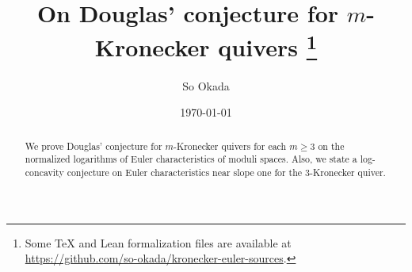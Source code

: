 \documentclass[11pt,a4paper]{article}
\title{On Douglas' conjecture for $m$-Kronecker quivers%
\thanks{Some \TeX{} and Lean formalization files are available at\\
\url{https://github.com/so-okada/kronecker-euler-sources}.}}
\author{So Okada}
\date{\today{}}
\numberwithin{equation}{section}
\theoremstyle{definition}
\theoremstyle{remark}
\begin{document}
\maketitle
\begin{abstract}
We prove Douglas' conjecture for $m$-Kronecker quivers for each $m\geq3$
on the normalized logarithms of Euler characteristics of moduli
spaces.
Also, we state a log-concavity conjecture on Euler characteristics near slope one for the 3-Kronecker quiver.
\end{abstract}














\end{document}
